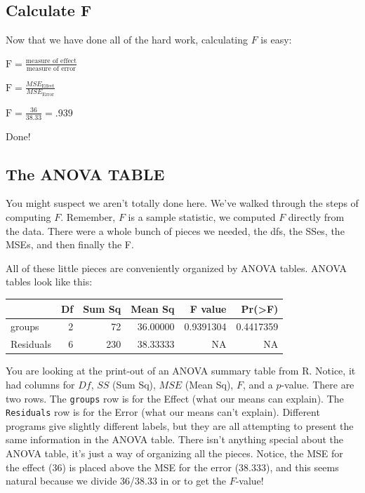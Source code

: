 \documentclass[
  letterpaper,
  DIV=11,
  numbers=noendperiod]{scrreprt}
\begin{document}
\subsection{Calculate F}\label{calculate-f}

Now that we have done all of the hard work, calculating \(F\) is easy:

\(\text{F} = \frac{\text{measure of effect}}{\text{measure of error}}\)

\(\text{F} = \frac{MSE_\text{Effect}}{MSE_\text{Error}}\)

\(\text{F} = \frac{36}{38.33} = .939\)

Done!

\subsection{The ANOVA TABLE}\label{the-anova-table}

You might suspect we aren't totally done here. We've walked through the
steps of computing \(F\). Remember, \(F\) is a sample statistic, we
computed \(F\) directly from the data. There were a whole bunch of
pieces we needed, the dfs, the SSes, the MSEs, and then finally the F.

All of these little pieces are conveniently organized by ANOVA tables.
ANOVA tables look like this:

\begin{longtable}[]{@{}lrrrrr@{}}
\toprule\noalign{}
& Df & Sum Sq & Mean Sq & F value & Pr(\textgreater F) \\
\midrule\noalign{}
\endhead
\bottomrule\noalign{}
\endlastfoot
groups & 2 & 72 & 36.00000 & 0.9391304 & 0.4417359 \\
Residuals & 6 & 230 & 38.33333 & NA & NA \\
\end{longtable}

You are looking at the print-out of an ANOVA summary table from R.
Notice, it had columns for \(Df\), \(SS\) (Sum Sq), \(MSE\) (Mean Sq),
\(F\), and a \(p\)-value. There are two rows. The \texttt{groups} row is
for the Effect (what our means can explain). The \texttt{Residuals} row
is for the Error (what our means can't explain). Different programs give
slightly different labels, but they are all attempting to present the
same information in the ANOVA table. There isn't anything special about
the ANOVA table, it's just a way of organizing all the pieces. Notice,
the MSE for the effect (36) is placed above the MSE for the error
(38.333), and this seems natural because we divide 36/38.33 in or to get
the \(F\)-value!
\end{document}

